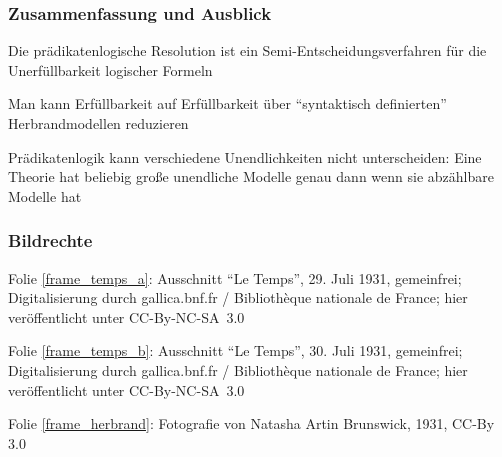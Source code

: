 \documentclass[aspectratio=1610,onlymath]{beamer}
\begin{document}
\begin{frame}\frametitle{Zusammenfassung und Ausblick}

Die prädikatenlogische Resolution ist ein Semi-Entscheidungsverfahren für die Unerfüllbarkeit logischer Formeln\bigskip

Man kann Erfüllbarkeit auf Erfüllbarkeit über "`syntaktisch definierten"' Herbrandmodellen reduzieren
\bigskip

Prädikatenlogik kann verschiedene Unendlichkeiten nicht unterscheiden: Eine Theorie hat beliebig große unendliche Modelle genau dann wenn sie abzählbare Modelle hat

\bigskip


\end{frame}


\begin{frame}[t]\frametitle{Bildrechte}

Folie \ref{frame_temps_a}: Ausschnitt ``Le Temps'', 29. Juli 1931, gemeinfrei; Digitalisierung durch gallica.bnf.fr / Bibliothèque nationale de France; hier veröffentlicht unter CC-By-NC-SA~3.0
\medskip

Folie \ref{frame_temps_b}: Ausschnitt ``Le Temps'', 30. Juli 1931, gemeinfrei; Digitalisierung durch gallica.bnf.fr / Bibliothèque nationale de France; hier veröffentlicht unter CC-By-NC-SA~3.0
\medskip

Folie \ref{frame_herbrand}: Fotografie von Natasha Artin Brunswick, 1931, CC-By 3.0

\end{frame}
\end{document}
